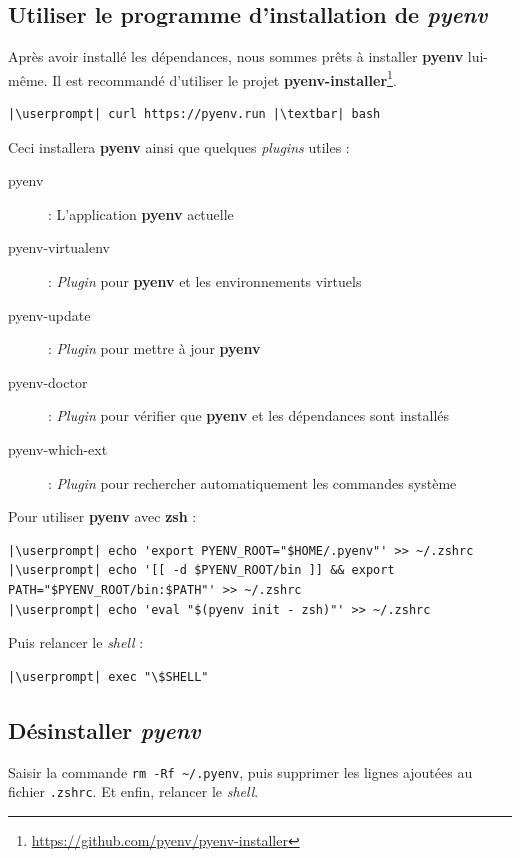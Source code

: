 \subsection*{Utiliser le programme d'installation de \textit{pyenv}}
Après avoir installé les dépendances, nous sommes prêts à installer \textbf{pyenv} lui-même. Il est recommandé d'utiliser le projet \textbf{pyenv-installer}\footnote{\url{https://github.com/pyenv/pyenv-installer}}.
\begin{lstlisting}[style=bash]
|\userprompt| curl https://pyenv.run |\textbar| bash
\end{lstlisting}

Ceci installera \textbf{pyenv} ainsi que quelques \textit{plugins} utiles :
\begin{description}
    \item[pyenv]: L'application \textbf{pyenv} actuelle
    \item[pyenv-virtualenv] : \textit{Plugin} pour \textbf{pyenv} et les environnements virtuels
    \item[pyenv-update] : \textit{Plugin} pour mettre à jour \textbf{pyenv}
    \item[pyenv-doctor] : \textit{Plugin} pour vérifier que \textbf{pyenv} et les dépendances sont installés
    \item[pyenv-which-ext] : \textit{Plugin} pour rechercher automatiquement les commandes système
\end{description}
\bigskip

Pour utiliser \textbf{pyenv} avec \textbf{zsh} :
\begin{lstlisting}[style=bash]
|\userprompt| echo 'export PYENV_ROOT="$HOME/.pyenv"' >> ~/.zshrc
|\userprompt| echo '[[ -d $PYENV_ROOT/bin ]] && export PATH="$PYENV_ROOT/bin:$PATH"' >> ~/.zshrc
|\userprompt| echo 'eval "$(pyenv init - zsh)"' >> ~/.zshrc 
\end{lstlisting}

Puis relancer le \textit{shell} :
\begin{lstlisting}[style=bash]
|\userprompt| exec "\$SHELL"
\end{lstlisting}

\subsection*{Désinstaller \textit{pyenv}}
Saisir la commande \verb|rm -Rf ~/.pyenv|, puis supprimer les lignes ajoutées au fichier \texttt{.zshrc}. Et enfin, relancer le \textit{shell}.

